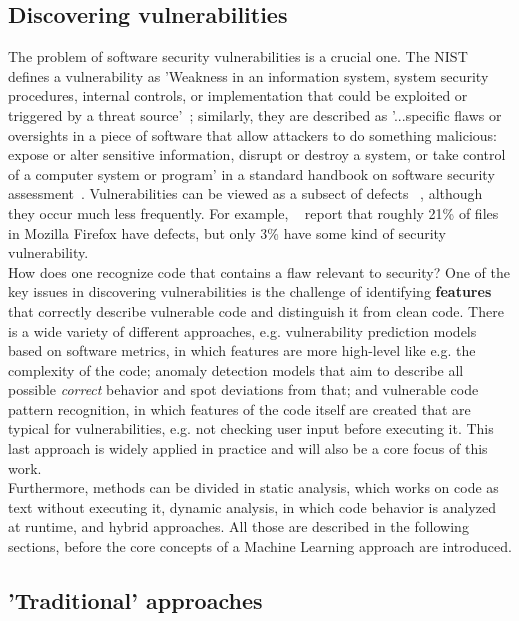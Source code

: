 \documentclass[
a4paper,
pagesize,
pdftex,
12pt,
twoside, %
BCOR=5mm, %
ngerman,
fleqn,
final,
]{scrartcl}
\begin{document}
	\subsection{Discovering vulnerabilities}
	
	The problem of software security vulnerabilities is a crucial one. The NIST defines a vulnerability as 'Weakness in an information system, system security procedures, internal controls, or implementation that could be exploited or triggered by a threat source'~\cite{NISTComputerSecurityRessourceCenter.}; similarly, they are described as '...specific flaws or oversights in a piece of software that allow attackers to do something malicious: expose or alter sensitive information, disrupt or destroy a system, or take control of a computer system or program' in a standard handbook on software security assessment~\cite{Dowd.2006}.
	Vulnerabilities can be viewed as a subsect of defects ~\cite{Morrison.2015}, although they occur much less frequently. For example, ~\cite{Shin.2013} report that roughly 21\% of files in Mozilla Firefox have defects, but only 3\% have some kind of security vulnerability. \\
	How does one recognize code that contains a flaw relevant to security? One of the key issues in discovering vulnerabilities is the challenge of identifying \textbf{features} that correctly describe vulnerable code and distinguish it from clean code. There is a wide variety of different approaches\citep{Ghaffarian.2017}, e.g. vulnerability prediction models based on software metrics, in which features are more high-level like e.g. the complexity of the code; anomaly detection models that aim to describe all possible \textit{correct} behavior and spot deviations from that; and vulnerable code pattern recognition, in which features of the code itself are created that are typical for vulnerabilities, e.g. not checking user input before executing it. This last approach is widely applied in practice and will also be a core focus of this work.\\
	Furthermore, methods can be divided in static analysis, which works on code as text without executing it, dynamic analysis, in which code behavior is analyzed at runtime, and hybrid approaches. All those are described in the following sections, before the core concepts of a Machine Learning approach are introduced.
	\subsection{'Traditional' approaches}
\end{document}
